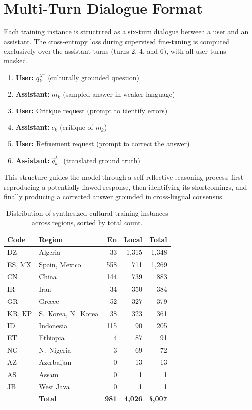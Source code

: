 \documentclass[11pt]{article}
\begin{document}
\section{Multi-Turn Dialogue Format}
\label{app:dialogue}
Each training instance is structured as a six-turn dialogue between a user and an assistant. The cross-entropy loss during supervised fine-tuning is computed exclusively over the assistant turns (turns 2, 4, and 6), with all user turns masked.
\begin{enumerate}
    \item \textbf{User:} $q_k^{\lambda^{-}}$ \hfill {\small(culturally grounded question)}
    \item \textbf{Assistant:} $m_k$ \hfill {\small(sampled answer in weaker language)}
    \item \textbf{User:} Critique request \hfill {\small(prompt to identify errors)}
    \item \textbf{Assistant:} $c_k$ \hfill {\small(critique of $m_k$)}
    \item \textbf{User:} Refinement request \hfill {\small(prompt to correct the answer)}
    \item \textbf{Assistant:} $\hat{g}_k^{\lambda^{-}}$ \hfill {\small(translated ground truth)}
\end{enumerate}
This structure guides the model through a self-reflective reasoning process: first reproducing a potentially flawed response, then identifying its shortcomings, and finally producing a corrected answer grounded in cross-lingual consensus.

\begin{table}[t]
\centering
\small
\begin{tabular}{llrrr}
\hline
\textbf{Code} & \textbf{Region} & \textbf{En} & \textbf{Local} & \textbf{Total} \\
\hline
DZ & Algeria & 33 & 1{,}315 & 1{,}348 \\
ES, MX & Spain, Mexico & 558 & 711 & 1{,}269 \\
CN & China & 144 & 739 & 883 \\
IR & Iran & 34 & 350 & 384 \\
GR & Greece & 52 & 327 & 379 \\
KR, KP & S.~Korea, N.~Korea & 38 & 323 & 361 \\
ID & Indonesia & 115 & 90 & 205 \\
ET & Ethiopia & 4 & 87 & 91 \\
NG & N.~Nigeria & 3 & 69 & 72 \\
AZ & Azerbaijan & 0 & 13 & 13 \\
AS & Assam & 0 & 1 & 1 \\
JB & West Java & 0 & 1 & 1 \\
\hline
& \textbf{Total} & \textbf{981} & \textbf{4{,}026} & \textbf{5{,}007} \\
\hline
\end{tabular}
\caption{Distribution of synthesized cultural training instances across regions, sorted by total count.}
\label{tab:training_data}
\end{table}
\end{document}

